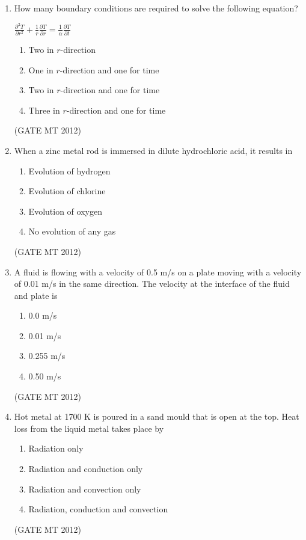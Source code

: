 \documentclass[journal, 11pt, onecolumn]{IEEEtran}
\theoremstyle{remark}
\begin{document}
\begin{enumerate}
\item How many boundary conditions are required to solve the following equation?\\
\begin{center}
$\displaystyle \frac{\partial^2 T}{\partial r^2} 
+ \frac{1}{r} \frac{\partial T}{\partial r} 
= \frac{1}{\alpha} \frac{\partial T}{\partial t}$    
\end{center}

\begin{multicols}{2}
\begin{enumerate}  
\item Two in $r$-direction
\item One in $r$-direction and one for time
\item Two in $r$-direction and one for time
\item Three in $r$-direction and one for time
\end{enumerate}
\end{multicols}
\hfill(GATE MT 2012)
 

\item When a zinc metal rod is immersed in dilute hydrochloric acid, it results in 
\begin{multicols}{2}
\begin{enumerate}  
\item Evolution of hydrogen
\item Evolution of chlorine
\item Evolution of oxygen
\item No evolution of any gas
\end{enumerate}
\end{multicols}
\hfill(GATE MT 2012)

 

\item A fluid is flowing with a velocity of 0.5 m/s on a plate moving with a velocity of 0.01 m/s in the same direction. The velocity at the interface of the fluid and plate is  
\begin{multicols}{4}
\begin{enumerate}  
\item 0.0 m/s
\item 0.01 m/s
\item 0.255 m/s
\item 0.50 m/s
\end{enumerate}
\end{multicols}
\hfill(GATE MT 2012)
 

\item Hot metal at 1700 K is poured in a sand mould that is open at the top. Heat loss from the liquid metal takes place by 
\begin{multicols}{2}
\begin{enumerate}  
\item Radiation only
\item Radiation and conduction only
\item Radiation and convection only
\item Radiation, conduction and convection
\end{enumerate}
\end{multicols}
\hfill(GATE MT 2012)
 


\end{enumerate}
\end{document}
